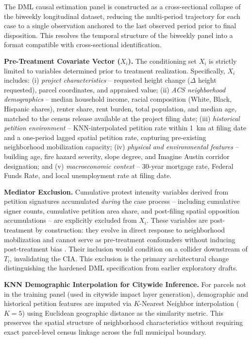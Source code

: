 \documentclass[11pt, letterpaper, oneside]{article}
\begin{document}
The DML causal estimation panel is constructed as a cross-sectional collapse of the biweekly longitudinal dataset, reducing the multi-period trajectory for each case to a single observation anchored to the last observed period prior to final disposition. This resolves the temporal structure of the biweekly panel into a format compatible with cross-sectional identification.

\textbf{Pre-Treatment Covariate Vector ($X_i$).} The conditioning set $X_i$ is strictly limited to variables determined prior to treatment realization. Specifically, $X_i$ includes: (i) \textit{project characteristics} -- requested height change ($\Delta$ height requested), parcel coordinates, and appraised value; (ii) \textit{ACS neighborhood demographics} -- median household income, racial composition (White, Black, Hispanic shares), renter share, rent burden, total population, and median age, matched to the census release available at the project filing date; (iii) \textit{historical petition environment} -- KNN-interpolated petition rate within 1~km at filing date and a one-period lagged spatial petition rate, capturing pre-existing neighborhood mobilization capacity; (iv) \textit{physical and environmental features} -- building age, fire hazard severity, slope degree, and Imagine Austin corridor designation; and (v) \textit{macroeconomic context} -- 30-year mortgage rate, Federal Funds Rate, and local unemployment rate at filing date.

\textbf{Mediator Exclusion.} Cumulative protest intensity variables derived from petition signatures accumulated \textit{during} the case process -- including cumulative signer counts, cumulative petition area share, and post-filing spatial opposition accumulations -- are explicitly excluded from $X_i$. These variables are post-treatment by construction: they evolve in direct response to neighborhood mobilization and cannot serve as pre-treatment confounders without inducing post-treatment bias \citep{angrist1996identification}. Their inclusion would condition on a collider downstream of $T_i$, invalidating the CIA. This exclusion is the primary architectural change distinguishing the hardened DML specification from earlier exploratory drafts.

\textbf{KNN Demographic Interpolation for Citywide Inference.} For parcels not in the training panel (used in citywide impact layer generation), demographic and historical petition features are imputed via $K$-Nearest Neighbor interpolation ($K=5$) using Euclidean geographic distance as the similarity metric. This preserves the spatial structure of neighborhood characteristics without requiring exact parcel-level census linkage across the full municipal boundary.
\end{document}
